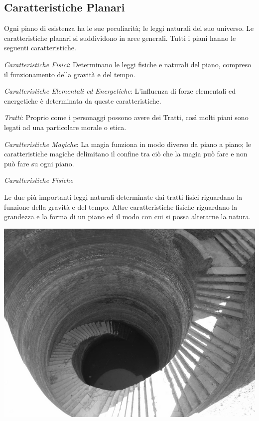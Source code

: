 \documentclass[a4paper,twoside,openany]{book}
\begin{document}
\begin{multicols}{2}
\subsection{Caratteristiche Planari}
Ogni piano di esistenza ha le sue peculiarità; le leggi naturali del suo universo. Le caratteristiche planari si suddividono in aree generali. Tutti i piani hanno le seguenti caratteristiche.

\emph{Caratteristiche Fisici}: Determinano le leggi fisiche e naturali del piano, compreso il funzionamento della gravità e del tempo.

\emph{Caratteristiche Elementali ed Energetiche}: L'influenza di forze elementali ed energetiche è determinata da queste caratteristiche.

\emph{Tratti}: Proprio come i personaggi possono avere dei Tratti, così molti piani sono legati ad una particolare morale o etica.

\emph{Caratteristiche Magiche}: La magia funziona in modo diverso da piano a piano; le caratteristiche magiche delimitano il confine tra ciò che la magia può fare e non può fare su ogni piano.

\emph{Caratteristiche Fisiche}

Le due più importanti leggi naturali determinate dai tratti fisici riguardano la funzione della gravità e del tempo. Altre caratteristiche fisiche riguardano la grandezza e la forma di un piano ed il modo con cui si possa alterarne la natura.

\medskip

\begin{center}
	\includegraphics[width=0.9\linewidth]{immagini/ancientwell.png}


\end{center}
\end{multicols}
\end{document}
